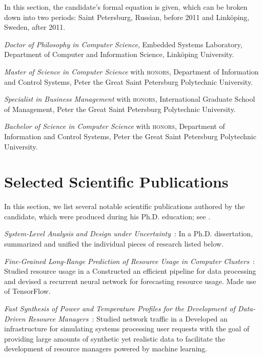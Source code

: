 \documentclass[journal]{IEEEtran}
\begin{document}
In this section, the candidate's formal equation is given, which can be broken
down into two periods: Saint Petersburg, Russian, before 2011 and Linköping,
Sweden, after 2011.

\date{2017} \emph{Doctor of Philosophy in Computer Science}, Embedded Systems
Laboratory, Department of Computer and Information Science, Linköping
University.

\date{2010} \emph{Master of Science in Computer Science} with \textsc{honors},
Department of Information and Control Systems, Peter the Great Saint Petersburg
Polytechnic University.

\date{2010} \emph{Specialist in Business Management} with \textsc{honors},
International Graduate School of Management, Peter the Great Saint Petersburg
Polytechnic University.

\date{2008} \emph{Bachelor of Science in Computer Science} with \textsc{honors},
Department of Information and Control Systems, Peter the Great Saint Petersburg
Polytechnic University.

\section{Selected Scientific Publications} 

In this section, we list several notable scientific publications authored by the
candidate, which were produced during his Ph.D. education; see .

\date{2017} \emph{System-Level Analysis and Design under
Uncertainty}~\cite{ukhov2017d}: In a Ph.D. dissertation, summarized and
unified the individual pieces of research listed below.

\date{2017} \emph{Fine-Grained Long-Range Prediction of Resource Usage in
Computer Clusters}~\cite{ukhov2017b}: Studied resource usage in a
 Constructed
an efficient pipeline for data processing and devised a recurrent neural network
for forecasting resource usage. Made use of TensorFlow.

\date{2017} \emph{Fast Synthesis of Power and Temperature Profiles for the
Development of Data-Driven Resource Managers}~\cite{ukhov2017c}: Studied network
traffic in a 
Developed an infrastructure for simulating systems processing user requests with
the goal of providing large amounts of synthetic yet realistic data to
facilitate the development of resource managers powered by machine learning.
\end{document}
